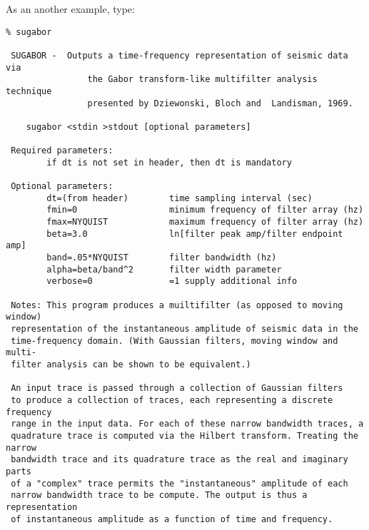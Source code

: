 {{As an another example, type:
{\small \begin{verbatim}
% sugabor
                                                                        
 SUGABOR -  Outputs a time-frequency representation of seismic data via
                the Gabor transform-like multifilter analysis technique 
                presented by Dziewonski, Bloch and  Landisman, 1969.    
                                                                        
    sugabor <stdin >stdout [optional parameters]                        
                                                                        
 Required parameters:                                                   
        if dt is not set in header, then dt is mandatory                
                                                                        
 Optional parameters:                                                   
        dt=(from header)        time sampling interval (sec)            
        fmin=0                  minimum frequency of filter array (hz)  
        fmax=NYQUIST            maximum frequency of filter array (hz)  
        beta=3.0                ln[filter peak amp/filter endpoint amp] 
        band=.05*NYQUIST        filter bandwidth (hz)                   
        alpha=beta/band^2       filter width parameter                  
        verbose=0               =1 supply additional info               
                                                                        
 Notes: This program produces a muiltifilter (as opposed to moving window)
 representation of the instantaneous amplitude of seismic data in the   
 time-frequency domain. (With Gaussian filters, moving window and multi-
 filter analysis can be shown to be equivalent.)                        
                                                                        
 An input trace is passed through a collection of Gaussian filters      
 to produce a collection of traces, each representing a discrete frequency
 range in the input data. For each of these narrow bandwidth traces, a 
 quadrature trace is computed via the Hilbert transform. Treating the narrow
 bandwidth trace and its quadrature trace as the real and imaginary parts
 of a "complex" trace permits the "instantaneous" amplitude of each
 narrow bandwidth trace to be compute. The output is thus a representation
 of instantaneous amplitude as a function of time and frequency.        
                                                                        

\end{verbatim}}}}

